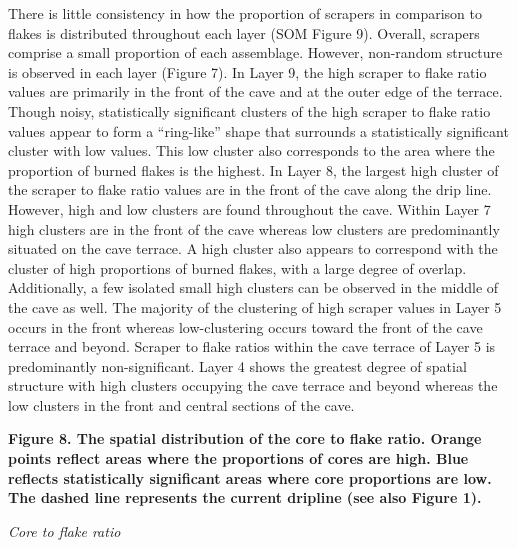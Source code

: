 \documentclass[smallextended]{svjour3}       %
\begin{document}
There is little consistency in how the proportion of scrapers in
comparison to flakes is distributed throughout each layer (SOM Figure
9). Overall, scrapers comprise a small proportion of each assemblage.
However, non-random structure is observed in each layer (Figure 7). In
Layer 9, the high scraper to flake ratio values are primarily in the
front of the cave and at the outer edge of the terrace. Though noisy,
statistically significant clusters of the high scraper to flake ratio
values appear to form a ``ring-like'' shape that surrounds a
statistically significant cluster with low values. This low cluster also
corresponds to the area where the proportion of burned flakes is the
highest. In Layer 8, the largest high cluster of the scraper to flake
ratio values are in the front of the cave along the drip line. However,
high and low clusters are found throughout the cave. Within Layer 7 high
clusters are in the front of the cave whereas low clusters are
predominantly situated on the cave terrace. A high cluster also appears
to correspond with the cluster of high proportions of burned flakes,
with a large degree of overlap. Additionally, a few isolated small high
clusters can be observed in the middle of the cave as well. The majority
of the clustering of high scraper values in Layer 5 occurs in the front
whereas low-clustering occurs toward the front of the cave terrace and
beyond. Scraper to flake ratios within the cave terrace of Layer 5 is
predominantly non-significant. Layer 4 shows the greatest degree of
spatial structure with high clusters occupying the cave terrace and
beyond whereas the low clusters in the front and central sections of the
cave.

\textbf{Figure 8. The spatial distribution of the core to flake ratio.
Orange points reflect areas where the proportions of cores are high.
Blue reflects statistically significant areas where core proportions are
low. The dashed line represents the current dripline (see also Figure
1).}

\emph{Core to flake ratio}
\end{document}
